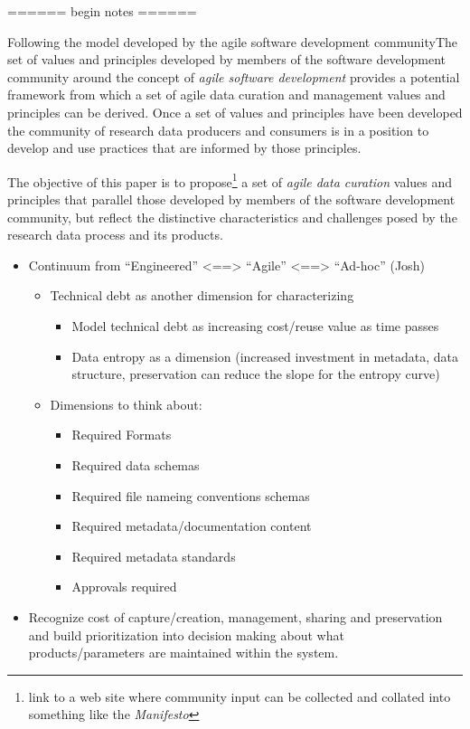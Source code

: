 \documentclass[paper]{ijdc-v9}
\providecommand{\tightlist}{%
  \setlength{\itemsep}{0pt}\setlength{\parskip}{0pt}}
\begin{document}
====== begin notes ======

Following the model developed by the agile software development
communityThe set of values and principles developed by members of the
software development community around the concept of \emph{agile
software development} provides a potential framework from which a set of
agile data curation and management values and principles can be derived.
Once a set of values and principles have been developed the community of
research data producers and consumers is in a position to develop and
use practices that are informed by those principles.

The objective of this paper is to propose\footnote{link to a web site
  where community input can be collected and collated into something
  like the \emph{Manifesto}} a set of \emph{agile data curation} values
and principles that parallel those developed by members of the software
development community, but reflect the distinctive characteristics and
challenges posed by the research data process and its products.

\begin{itemize}
\tightlist
\item
  Continuum from ``Engineered'' \textless{}==\textgreater{} ``Agile''
  \textless{}==\textgreater{} ``Ad-hoc'' (Josh)

  \begin{itemize}
  \tightlist
  \item
    Technical debt as another dimension for characterizing

    \begin{itemize}
    \tightlist
    \item
      Model technical debt as increasing cost/reuse value as time passes
    \item
      Data entropy as a dimension (increased investment in metadata,
      data structure, preservation can reduce the slope for the entropy
      curve)
    \end{itemize}
  \item
    Dimensions to think about:

    \begin{itemize}
    \tightlist
    \item
      Required Formats
    \item
      Required data schemas
    \item
      Required file nameing conventions schemas
    \item
      Required metadata/documentation content
    \item
      Required metadata standards
    \item
      Approvals required
    \end{itemize}
  \end{itemize}
\item
  Recognize cost of capture/creation, management, sharing and
  preservation and build prioritization into decision making about what
  products/parameters are maintained within the system.
\end{itemize}
\end{document}
